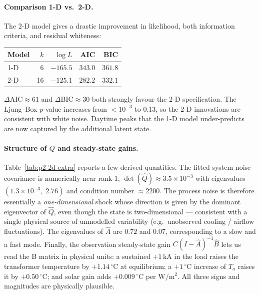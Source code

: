 \documentclass[11pt,a4paper]{article}
\begin{document}
\paragraph{Comparison 1-D vs.\ 2-D.}
The 2-D model gives a drastic improvement in likelihood, both information
criteria, and residual whiteness:
\begin{center}
\begin{tabular}{lrrrr}
  \toprule
  Model & $k$ & $\log L$ & AIC & BIC \\
  \midrule
  1-D   & 6  & $-165.5$ & $343.0$ & $361.8$ \\
  2-D   & 16 & $-125.1$ & $282.2$ & $332.1$ \\
  \bottomrule
\end{tabular}
\end{center}
$\Delta\text{AIC}\approx 61$ and $\Delta\text{BIC}\approx 30$ both strongly
favour the 2-D specification. The Ljung--Box $p$-value increases from
$<10^{-3}$ to $0.13$, so the 2-D innovations are consistent with white noise.
Daytime peaks that the 1-D model under-predicts are now captured by the
additional latent state.

\paragraph{Structure of $Q$ and steady-state gains.}
Table~\ref{tab:p2-2d-extra} reports a few derived quantities. The fitted
system noise covariance is numerically near rank-1,
$\det(\hat Q)\approx 3.5\times 10^{-3}$ with eigenvalues
$(1.3\times 10^{-3},\;2.76)$ and condition number $\approx 2200$. The
process noise is therefore essentially a \emph{one-dimensional} shock
whose direction is given by the dominant eigenvector of $\hat Q$, even
though the state is two-dimensional --- consistent with a single physical
source of unmodelled variability (e.g.\ unobserved cooling / airflow
fluctuations). The eigenvalues of $\hat A$ are $0.72$ and $0.07$,
corresponding to a slow and a fast mode. Finally, the observation
steady-state gain $C(I-\hat A)^{-1}\hat B$ lets us read the B matrix in
physical units: a sustained $+1\,$kA in the load raises the transformer
temperature by $+1.14\,^\circ$C at equilibrium; a $+1\,^\circ$C increase
of $T_a$ raises it by $+0.50\,^\circ$C; and solar gain adds
$+0.009\,^\circ$C per $\mathrm{W/m^2}$. All three signs and magnitudes are
physically plausible.

\begin{table}[H]
  \centering
  \caption{Derived quantities from the fitted 2-D model.}
  \label{tab:p2-2d-extra}
  
\end{table}
\end{document}
